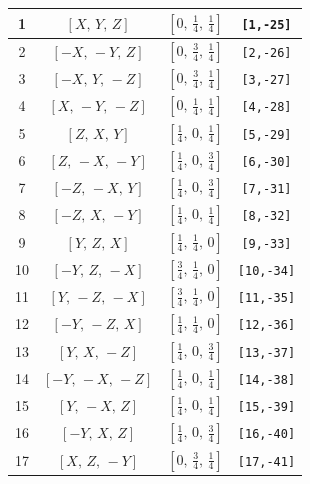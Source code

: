 \documentclass[fleqn,8pt]{jsarticle}
\begin{document}
\begin{longtable}{cccc}
1 & $\left[ X,\, Y,\, Z \right]$ & $\left[ 0,\, \frac{1}{4},\, \frac{1}{4} \right]$ & {\tt [1,-25]} \\ \hline
2 & $\left[ - X,\, - Y,\, Z \right]$ & $\left[ 0,\, \frac{3}{4},\, \frac{1}{4} \right]$ & {\tt [2,-26]} \\ \hline
3 & $\left[ - X,\, Y,\, - Z \right]$ & $\left[ 0,\, \frac{3}{4},\, \frac{1}{4} \right]$ & {\tt [3,-27]} \\ \hline
4 & $\left[ X,\, - Y,\, - Z \right]$ & $\left[ 0,\, \frac{1}{4},\, \frac{1}{4} \right]$ & {\tt [4,-28]} \\ \hline
5 & $\left[ Z,\, X,\, Y \right]$ & $\left[ \frac{1}{4},\, 0,\, \frac{1}{4} \right]$ & {\tt [5,-29]} \\ \hline
6 & $\left[ Z,\, - X,\, - Y \right]$ & $\left[ \frac{1}{4},\, 0,\, \frac{3}{4} \right]$ & {\tt [6,-30]} \\ \hline
7 & $\left[ - Z,\, - X,\, Y \right]$ & $\left[ \frac{1}{4},\, 0,\, \frac{3}{4} \right]$ & {\tt [7,-31]} \\ \hline
8 & $\left[ - Z,\, X,\, - Y \right]$ & $\left[ \frac{1}{4},\, 0,\, \frac{1}{4} \right]$ & {\tt [8,-32]} \\ \hline
9 & $\left[ Y,\, Z,\, X \right]$ & $\left[ \frac{1}{4},\, \frac{1}{4},\, 0 \right]$ & {\tt [9,-33]} \\ \hline
10 & $\left[ - Y,\, Z,\, - X \right]$ & $\left[ \frac{3}{4},\, \frac{1}{4},\, 0 \right]$ & {\tt [10,-34]} \\ \hline
11 & $\left[ Y,\, - Z,\, - X \right]$ & $\left[ \frac{3}{4},\, \frac{1}{4},\, 0 \right]$ & {\tt [11,-35]} \\ \hline
12 & $\left[ - Y,\, - Z,\, X \right]$ & $\left[ \frac{1}{4},\, \frac{1}{4},\, 0 \right]$ & {\tt [12,-36]} \\ \hline
13 & $\left[ Y,\, X,\, - Z \right]$ & $\left[ \frac{1}{4},\, 0,\, \frac{3}{4} \right]$ & {\tt [13,-37]} \\ \hline
14 & $\left[ - Y,\, - X,\, - Z \right]$ & $\left[ \frac{1}{4},\, 0,\, \frac{1}{4} \right]$ & {\tt [14,-38]} \\ \hline
15 & $\left[ Y,\, - X,\, Z \right]$ & $\left[ \frac{1}{4},\, 0,\, \frac{1}{4} \right]$ & {\tt [15,-39]} \\ \hline
16 & $\left[ - Y,\, X,\, Z \right]$ & $\left[ \frac{1}{4},\, 0,\, \frac{3}{4} \right]$ & {\tt [16,-40]} \\ \hline
17 & $\left[ X,\, Z,\, - Y \right]$ & $\left[ 0,\, \frac{3}{4},\, \frac{1}{4} \right]$ & {\tt [17,-41]} \\ \hline

\end{longtable}
\end{document}
